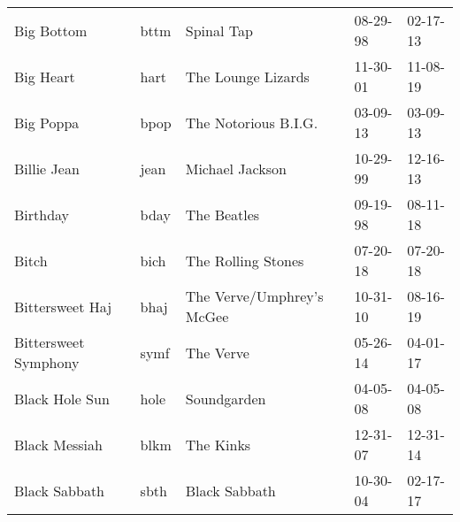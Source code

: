 \begin{longtable}{p{}p{}p{}p{}p{}}
                                                              Big Bottom &          bttm &                                               Spinal Tap &              08-29-98 &             02-17-13 \\
                                                               Big Heart &          hart &                                       The Lounge Lizards &              11-30-01 &             11-08-19 \\
                                                               Big Poppa &          bpop &                                     The Notorious B.I.G. &              03-09-13 &             03-09-13 \\
                                                             Billie Jean &          jean &                                          Michael Jackson &              10-29-99 &             12-16-13 \\
                                                                Birthday &          bday &                                              The Beatles &              09-19-98 &             08-11-18 \\
                                                                   Bitch &          bich &                                       The Rolling Stones &              07-20-18 &             07-20-18 \\
                                                         Bittersweet Haj &          bhaj &                                The Verve/Umphrey's McGee &              10-31-10 &             08-16-19 \\
                                                    Bittersweet Symphony &          symf &                                                The Verve &              05-26-14 &             04-01-17 \\
                                                          Black Hole Sun &          hole &                                              Soundgarden &              04-05-08 &             04-05-08 \\
                                                           Black Messiah &          blkm &                                                The Kinks &              12-31-07 &             12-31-14 \\
                                                           Black Sabbath &          sbth &                                            Black Sabbath &              10-30-04 &             02-17-17 \\

\end{longtable}
